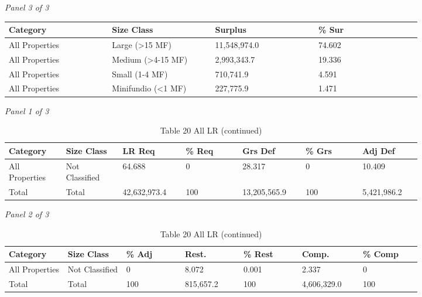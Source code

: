 \documentclass[12pt]{article}
\begin{document}
\begin{landscape}
\begin{table}[H]
\textit{Panel 3 of 3}\\[2pt]
{\fontsize{12}{14}\selectfont
\setlength{\tabcolsep}{3pt}
\renewcommand{\arraystretch}{1.08}
\begin{tabular}{p{0.205\linewidth}p{0.205\linewidth}p{0.205\linewidth}p{0.205\linewidth}}
\toprule
Category & Size Class & Surplus & \% Sur \\
\midrule
All Properties & Large (>15 MF) & 11,548,974.0 & 74.602 \\
All Properties & Medium (>4-15 MF) & 2,993,343.7 & 19.336 \\
All Properties & Small (1-4 MF) & 710,741.9 & 4.591 \\
All Properties & Minifundio (<1 MF) & 227,775.9 & 1.471 \\
\bottomrule
\end{tabular}
}
\end{table}
\begin{table}[H]
\centering
\caption{Table 20 All LR (continued)}
\textit{Panel 1 of 3}\\[2pt]
{\fontsize{12}{14}\selectfont
\setlength{\tabcolsep}{3pt}
\renewcommand{\arraystretch}{1.08}
\begin{tabular}{p{0.117\linewidth}p{0.117\linewidth}p{0.117\linewidth}p{0.117\linewidth}p{0.117\linewidth}p{0.117\linewidth}p{0.117\linewidth}}
\toprule
Category & Size Class & LR Req & \% Req & Grs Def & \% Grs & Adj Def \\
\midrule
All Properties & Not Classified & 64.688 & 0 & 28.317 & 0 & 10.409 \\
Total & Total & 42,632,973.4 & 100 & 13,205,565.9 & 100 & 5,421,986.2 \\
\bottomrule
\end{tabular}
}

\vspace{0.6em}

\textit{Panel 2 of 3}\\[2pt]
{\fontsize{12}{14}\selectfont
\setlength{\tabcolsep}{3pt}
\renewcommand{\arraystretch}{1.08}
\begin{tabular}{p{0.117\linewidth}p{0.117\linewidth}p{0.117\linewidth}p{0.117\linewidth}p{0.117\linewidth}p{0.117\linewidth}p{0.117\linewidth}}
\toprule
Category & Size Class & \% Adj & Rest. & \% Rest & Comp. & \% Comp \\
\midrule
All Properties & Not Classified & 0 & 8.072 & 0.001 & 2.337 & 0 \\
Total & Total & 100 & 815,657.2 & 100 & 4,606,329.0 & 100 \\
\bottomrule
\end{tabular}
}


\end{table}
\end{landscape}
\end{document}
